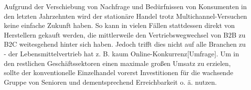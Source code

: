 


\begin{folding} %

Aufgrund der Verschiebung von Nachfrage und Bedürfnissen von Konsumenten in den letzten Jahrzehnten wird der stationäre Handel trotz Multichannel-Versuchen keine einfache Zukunft haben. So kann in vielen Fällen stattdessen direkt von Herstellern gekauft werden, die mittlerweile den Vertriebswegwechsel von \ac{B2B} zu \ac{B2C} weitesgehend hinter sich haben. Jedoch trifft dies nicht auf alle Branchen zu - der Lebensmittelvertrieb hat z. B. kaum Online-Konkurrenz[Umfrage]. Um in den restlichen Geschäftssektoren einen maximale großen Umsatz zu erzielen, sollte der konventionelle Einzelhandel vorerst Investitionen für die wachsende Gruppe von Senioren und dementsprechend  Erreichbarkeit o. ä. nutzen.

\end{folding}

